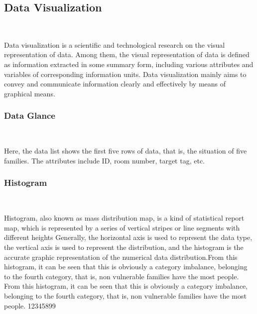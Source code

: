 \subsection{Data Visualization}
\

Data visualization is a scientific and technological research on the visual representation of data. Among them, the visual representation of data is defined as information extracted in some summary form, including various attributes and variables of corresponding information units. Data visualization mainly aims to convey and communicate information clearly and effectively by means of graphical means.

\subsubsection{Data Glance}
\

Here, the data list shows the first five rows of data, that is, the situation of five families. The attributes include ID, room number, target tag, etc.





\subsubsection{Histogram}
\

Histogram, also known as mass distribution map, is a kind of statistical report map, which is represented by a series of vertical stripes or line segments with different heights Generally, the horizontal axis is used to represent the data type, the vertical axis is used to represent the distribution, and the histogram is the accurate graphic representation of the numerical data distribution.From this histogram, it can be seen that this is obviously a category imbalance, belonging to the fourth category, that is, non vulnerable families have the most people. From this histogram, it can be seen that this is obviously a category imbalance, belonging to the fourth category, that is, non vulnerable families have the most people.
12345899

